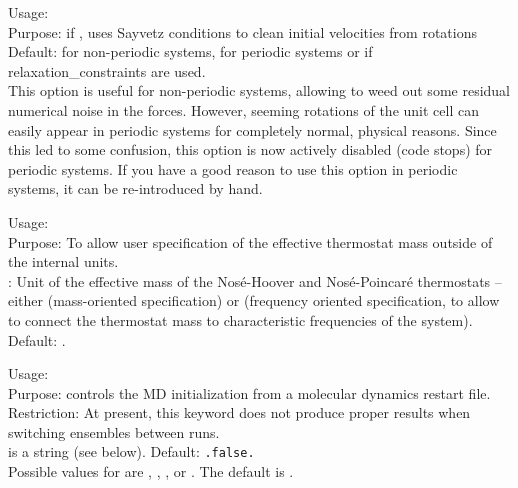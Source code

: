 {\noindent
      Usage:  \\[1.0ex]
      Purpose: if , uses Sayvetz conditions to clean initial velocities from rotations\\[1.0ex]
      Default:  for non-periodic systems,  for
      periodic systems or if relaxation\_constraints are used.\\} 
This option is useful for non-periodic systems, allowing to weed out some
residual numerical noise in the forces. However, seeming rotations of the unit
cell can easily appear in periodic systems for completely normal, physical
reasons. Since this led to some confusion, this option is now actively
disabled (code stops) for periodic systems. If you have a good reason to use
this option in periodic systems, it can be re-introduced by hand.

{\noindent
  Usage:   \\[1.0ex]
  Purpose: To allow user specification of the effective thermostat
  mass outside of the internal units. \\[1.0ex]
   : Unit of the effective mass of the Nos\'e-Hoover and
    Nos\'e-Poincar\'e thermostats --
    either  (mass-oriented specification) or
     (frequency oriented specification, to
    allow to connect the thermostat mass to characteristic frequencies
    of the system). Default:  . \\}

{\noindent
        Usage:   \\[1.0ex]
        Purpose: controls the MD initialization from a molecular
          dynamics restart file. \\[1.0ex]
        Restriction: At present, this keyword does not produce proper results
          when switching ensembles between runs. \\[1.0ex]  
         is a string (see below). Default:
          \texttt{.false.} \\
} 
Possible values for  are , , 
, or . The default is . 

